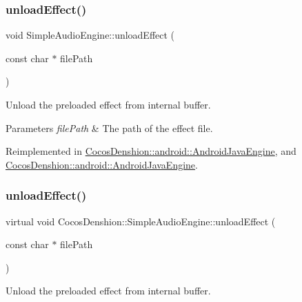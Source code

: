 \subsubsection{\texorpdfstring{unload\+Effect()}{unloadEffect()}\hspace{0.1cm}{\footnotesize\ttfamily [1/2]}}
{\footnotesize\ttfamily void Simple\+Audio\+Engine\+::unload\+Effect (\begin{DoxyParamCaption}\item[{const char $\ast$}]{file\+Path }\end{DoxyParamCaption})\hspace{0.3cm}{\ttfamily [virtual]}}

Unload the preloaded effect from internal buffer.


\begin{DoxyParams}{Parameters}
{\em file\+Path} & The path of the effect file. \\
\hline
\end{DoxyParams}


Reimplemented in \hyperlink{classCocosDenshion_1_1android_1_1AndroidJavaEngine_a7d11887670799c98fdeb2b7ece2efad9}{Cocos\+Denshion\+::android\+::\+Android\+Java\+Engine}, and \hyperlink{classCocosDenshion_1_1android_1_1AndroidJavaEngine_abd45269bfe825e27b489fccc963b57c0}{Cocos\+Denshion\+::android\+::\+Android\+Java\+Engine}.

\mbox{\label{classCocosDenshion_1_1SimpleAudioEngine_a4af33efd9b00e232a5ef18ccefdbcda0}} 
\subsubsection{\texorpdfstring{unload\+Effect()}{unloadEffect()}\hspace{0.1cm}{\footnotesize\ttfamily [2/2]}}
{\footnotesize\ttfamily virtual void Cocos\+Denshion\+::\+Simple\+Audio\+Engine\+::unload\+Effect (\begin{DoxyParamCaption}\item[{const char $\ast$}]{file\+Path }\end{DoxyParamCaption})\hspace{0.3cm}{\ttfamily [virtual]}}

Unload the preloaded effect from internal buffer.


